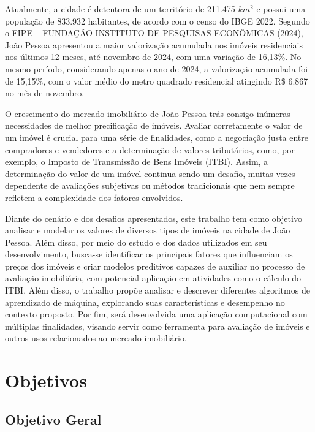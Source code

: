 \documentclass[
  12pt,
  a4paper,
]{scrreprt}
\begin{document}
Atualmente, a cidade é detentora de um território de 211.475 \(km^2\) e
possui uma população de 833.932 habitantes, de acordo com o censo do
IBGE 2022. Segundo o FIPE -- FUNDAÇÃO INSTITUTO DE PESQUISAS ECONÔMICAS
(2024), João Pessoa apresentou a maior valorização acumulada nos imóveis
residenciais nos últimos 12 meses, até novembro de 2024, com uma
variação de 16,13\%. No mesmo período, considerando apenas o ano de
2024, a valorização acumulada foi de 15,15\%, com o valor médio do metro
quadrado residencial atingindo R\$ 6.867 no mês de novembro.

\vspace{12pt}

O crescimento do mercado imobiliário de João Pessoa trás consigo
inúmeras necessidades de melhor precificação de imóveis. Avaliar
corretamente o valor de um imóvel é crucial para uma série de
finalidades, como a negociação justa entre compradores e vendedores e a
determinação de valores tributários, como, por exemplo, o Imposto de
Transmissão de Bens Imóveis (ITBI). Assim, a determinação do valor de um
imóvel continua sendo um desafio, muitas vezes dependente de avaliações
subjetivas ou métodos tradicionais que nem sempre refletem a
complexidade dos fatores envolvidos.

\vspace{12pt}

Diante do cenário e dos desafios apresentados, este trabalho tem como
objetivo analisar e modelar os valores de diversos tipos de imóveis na
cidade de João Pessoa. Além disso, por meio do estudo e dos dados
utilizados em seu desenvolvimento, busca-se identificar os principais
fatores que influenciam os preços dos imóveis e criar modelos preditivos
capazes de auxiliar no processo de avaliação imobiliária, com potencial
aplicação em atividades como o cálculo do ITBI. Além disso, o trabalho
propõe analisar e descrever diferentes algoritmos de aprendizado de
máquina, explorando suas características e desempenho no contexto
proposto. Por fim, será desenvolvida uma aplicação computacional com
múltiplas finalidades, visando servir como ferramenta para avaliação de
imóveis e outros usos relacionados ao mercado imobiliário.

\section{Objetivos}\label{objetivos}

\subsection{Objetivo Geral}\label{objetivo-geral}
\end{document}
